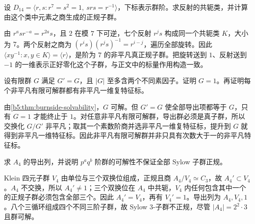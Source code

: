 \begin{exercise}\label{b5:ex:05-dihedral-class-normal}
	设 \(D_{14}=\langle r,s:r^7=s^2=1,\ srs=r^{-1}\rangle\)，下标表示群阶。求反射的共轭类，并计算由这个类中元素之商生成的正规子群。
\end{exercise}
\begin{solution}
	由 \(r^a s r^{-a}=r^{2a}s\)，且 \(2\) 在模 \(7\) 下可逆，七个反射 \(r^j s\) 构成同一个共轭类 \(K\)，大小为 \(7\)。两个反射之商为 \((r^i s)(r^j s)^{-1}=r^{i-j}\)，遍历全部旋转。因此 \(\langle xy^{-1}:x,y\in K\rangle=\langle r\rangle\)，是阶为 \(7\) 的非平凡真正规子群。把旋转送到 \(1\)、反射送到 \(-1\) 的一维表示正好零化这个子群，与正文中的标量作用构造一致。
\end{solution}

\begin{exercise}\label{b5:ex:05-perfect-two-primes}
	设有限群 \(G\) 满足 \(G'=G\)，且 \(|G|\) 至多含两个不同素因子。证明 \(G=1\)。再证明每个非平凡有限可解群都有非平凡一维复特征标。
\end{exercise}
\begin{solution}
	由\cref{b5:thm:burnside-solvability}，\(G\) 可解。但 \(G'=G\) 使全部导出项都等于 \(G\)，只有 \(G=1\) 才能终止于 \(1\)。对任意非平凡有限可解群，导出群必须是真子群，所以交换化 \(G/G'\) 非平凡；取其一个素数阶商并选非平凡一维复特征标，提升到 \(G\) 就得到非平凡一维特征标。因此非平凡有限可解群并非只具有次数大于一的非平凡特征标。
\end{solution}

\begin{exercise}\label{b5:ex:05-a4-derived}
	求 \(A_4\) 的导出列，并说明 \(p^a q^b\) 阶群的可解性不保证全部 Sylow 子群正规。
\end{exercise}
\begin{solution}
	Klein 四元子群 \(V_4\) 由单位与三个双换位组成，正规且商 \(A_4/V_4\simeq C_3\)，故 \(A_4'\subset V_4\)。\(A_4\) 不交换，所以 \(A_4'\ne1\)；三个双换位在 \(A_4\) 中共轭，\(V_4\) 内任何包含其中一个的正规子群必须包含全部三个。因此 \(A_4'=V_4\)，再有 \(V_4'=1\)。导出列为 \(A_4,V_4,1\)。八个三循环组成四个不同三阶子群，故 Sylow \(3\)-子群不正规，尽管 \(|A_4|=2^2\cdot3\) 且群可解。
\end{solution}

